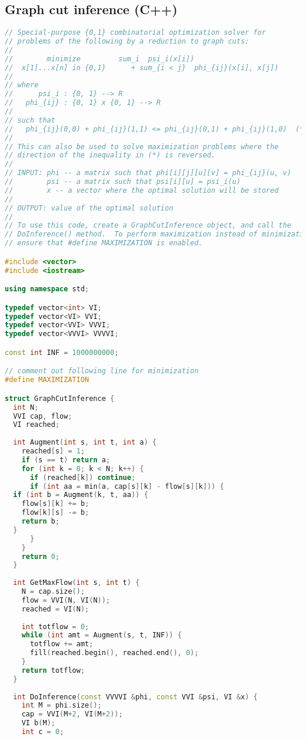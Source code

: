 \subsection{Graph cut inference (C++)}
\begin{lstlisting}[language=C++]
// Special-purpose {0,1} combinatorial optimization solver for
// problems of the following by a reduction to graph cuts:
//
//        minimize         sum_i  psi_i(x[i]) 
//  x[1]...x[n] in {0,1}      + sum_{i < j}  phi_{ij}(x[i], x[j])
//
// where
//      psi_i : {0, 1} --> R
//   phi_{ij} : {0, 1} x {0, 1} --> R
//
// such that
//   phi_{ij}(0,0) + phi_{ij}(1,1) <= phi_{ij}(0,1) + phi_{ij}(1,0)  (*)
//
// This can also be used to solve maximization problems where the
// direction of the inequality in (*) is reversed.
//
// INPUT: phi -- a matrix such that phi[i][j][u][v] = phi_{ij}(u, v)
//        psi -- a matrix such that psi[i][u] = psi_i(u)
//        x -- a vector where the optimal solution will be stored
//
// OUTPUT: value of the optimal solution
//
// To use this code, create a GraphCutInference object, and call the
// DoInference() method.  To perform maximization instead of minimization,
// ensure that #define MAXIMIZATION is enabled.

#include <vector>
#include <iostream>

using namespace std;

typedef vector<int> VI;
typedef vector<VI> VVI;
typedef vector<VVI> VVVI;
typedef vector<VVVI> VVVVI;

const int INF = 1000000000;

// comment out following line for minimization
#define MAXIMIZATION

struct GraphCutInference {
  int N;
  VVI cap, flow;
  VI reached;
  
  int Augment(int s, int t, int a) {
    reached[s] = 1;
    if (s == t) return a; 
    for (int k = 0; k < N; k++) {
      if (reached[k]) continue;
      if (int aa = min(a, cap[s][k] - flow[s][k])) {
  if (int b = Augment(k, t, aa)) {
    flow[s][k] += b;
    flow[k][s] -= b;
    return b;
  }
      }
    }
    return 0;
  }
  
  int GetMaxFlow(int s, int t) {
    N = cap.size();
    flow = VVI(N, VI(N));
    reached = VI(N);
    
    int totflow = 0;
    while (int amt = Augment(s, t, INF)) {
      totflow += amt;
      fill(reached.begin(), reached.end(), 0);
    }
    return totflow;
  }
  
  int DoInference(const VVVVI &phi, const VVI &psi, VI &x) {
    int M = phi.size();
    cap = VVI(M+2, VI(M+2));
    VI b(M);
    int c = 0;


\end{lstlisting}
